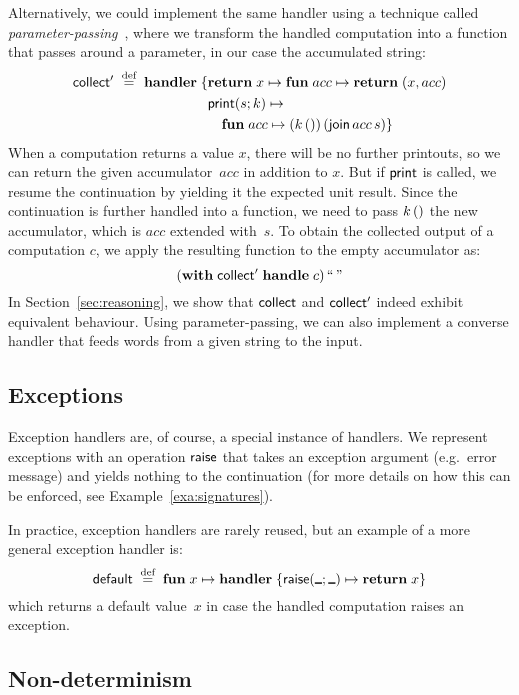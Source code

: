\documentclass{article}
\begin{document}
Alternatively, we could implement the same handler using a technique called
\emph{parameter-passing}~\cite{DBLP:journals/corr/PlotkinP13},
where we transform the handled computation into a function that passes around a parameter,
in our case the accumulated string:
%
\begin{align*}
  \kst{collect'} \defeq \handler \{
  &\retclause{x}
    \fun{acc} \return (x, acc) \\
  &\opclause[\print]{s}{k} \\
  &\quad \fun{acc} (k \, \unt) \, (\kst{join} \, acc \, s)
  \}
\end{align*}
%
When a computation returns a value $x$, there will be no further printouts,
so we can return the given accumulator~$acc$ in addition to $x$. But if $\print$
is called, we resume the continuation by yielding it the expected unit result.
Since the continuation is further handled into a function, we need to
pass $k \, \unt$ the new accumulator, which is $acc$ extended with~$s$. To obtain the collected
output of a computation $c$, we apply the resulting function to the empty
accumulator as:
\[
  (\withhandle{\kst{collect'}}{c}) \, \str{\,}
\]
In Section~\ref{sec:reasoning}, we show that $\kst{collect}$ and $\kst{collect'}$
indeed exhibit equivalent behaviour.
Using parameter-passing, we can also implement a converse handler that feeds
words from a given string to the input. 

\subsection{Exceptions}

Exception handlers are, of course, a special instance of handlers. We represent
exceptions with an operation $\op[raise]$ that takes an exception argument
(e.g.~error message) and yields nothing to the continuation (for more details
on how this can be enforced, see Example~\ref{exa:signatures}).

In practice, exception handlers are rarely reused, but an example of a more
general exception handler is:
\[
  \kst{default} \defeq \fun{x} \handler \{
    \opclause[{\op[raise]}]{\anon}{\anon} \return x
  \}
\]
which returns a default value~$x$ in case the handled computation raises an
exception.

\subsection{Non-determinism}
\end{document}
